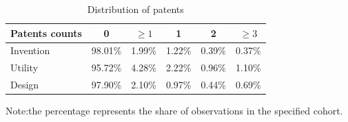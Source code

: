 \documentclass[english]{article}
\begin{document}
\begin{table}[H]
\centering
\caption{Distribution of patents}
\label{T3}
\begin{tabular}{lccccc}
\hline\hline
Patents counts & 0       & $\geq 1$ & 1      & 2      & $\geq 3$ \\
\hline\hline 
Invention&98.01\% & 1.99\% & 1.22\% & 0.39\% & 0.37\% \\
Utility&95.72\% & 4.28\% & 2.22\% & 0.96\% & 1.10\% \\
Design&97.90\% & 2.10\% & 0.97\% & 0.44\% & 0.69\% \\
\hline\hline
\end{tabular}

{\small{}Note:the percentage represents the share of observations in the specified cohort.}{\small \par}
\end{table}
\end{document}
